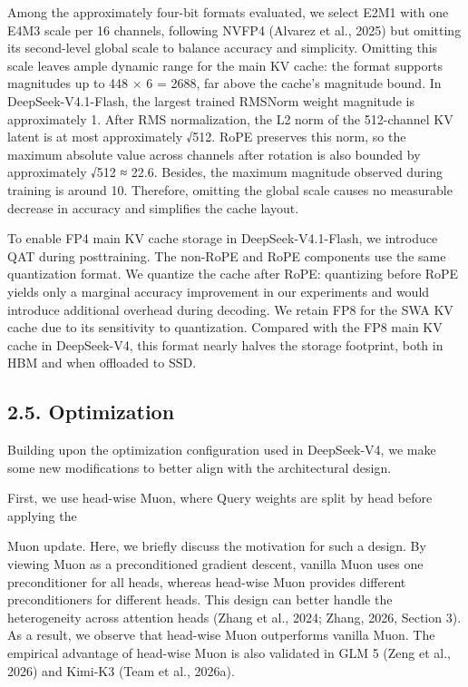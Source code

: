 \documentclass[
  10
]{article}
\begin{document}
Among the approximately four-bit formats evaluated, we select E2M1 with
one E4M3 scale per 16 channels, following NVFP4 (Alvarez et al., 2025)
but omitting its second-level global scale to balance accuracy and
simplicity. Omitting this scale leaves ample dynamic range for the main
KV cache: the format supports magnitudes up to 448 × 6 = 2688, far above
the cache's magnitude bound. In DeepSeek-V4.1-Flash, the largest trained
RMSNorm weight magnitude is approximately 1. After RMS normalization,
the L2 norm of the 512-channel KV latent is at most approximately √512.
RoPE preserves this norm, so the maximum absolute value across channels
after rotation is also bounded by approximately √512 ≈ 22.6. Besides,
the maximum magnitude observed during training is around 10. Therefore,
omitting the global scale causes no measurable decrease in accuracy and
simplifies the cache layout.

To enable FP4 main KV cache storage in DeepSeek-V4.1-Flash, we introduce
QAT during posttraining. The non-RoPE and RoPE components use the same
quantization format. We quantize the cache after RoPE: quantizing before
RoPE yields only a marginal accuracy improvement in our experiments and
would introduce additional overhead during decoding. We retain FP8 for
the SWA KV cache due to its sensitivity to quantization. Compared with
the FP8 main KV cache in DeepSeek-V4, this format nearly halves the
storage footprint, both in HBM and when offloaded to SSD.

\subsection{2.5. Optimization}\label{optimization}

Building upon the optimization configuration used in DeepSeek-V4, we
make some new modifications to better align with the architectural
design.

First, we use head-wise Muon, where Query weights are split by head
before applying the

Muon update. Here, we briefly discuss the motivation for such a design.
By viewing Muon as a preconditioned gradient descent, vanilla Muon uses
one preconditioner for all heads, whereas head-wise Muon provides
different preconditioners for different heads. This design can better
handle the heterogeneity across attention heads (Zhang et al., 2024;
Zhang, 2026, Section 3). As a result, we observe that head-wise Muon
outperforms vanilla Muon. The empirical advantage of head-wise Muon is
also validated in GLM 5 (Zeng et al., 2026) and Kimi-K3 (Team et al.,
2026a).
\end{document}
